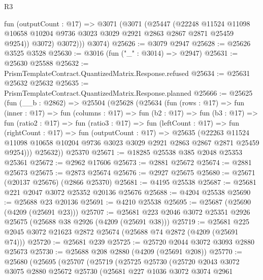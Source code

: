 \begin{lexlean}{R3}
\begin{coremodule}
          fun (outputCount : @17) =>
          @3071
            (@3071
              (@25447
                (@22248
                  @11524
                  @11098
                  @10658
                  @10204
                  @9736
                  @3023
                  @3029
                  @2921
                  @2863
                  @2867
                  @2871
                  @25459
                  @9254))
              @3072)
            @3072)))
      @3074)
@25626 := @3079 @2947
@25628 := @25626 @3525 @3528
@25630 := @3016 (fun ("_" : @3014) => @2947)
@25631 := @25630 @25588
@25632 := PrismTemplateContract.QuantizedMatrix.Response.refused
@25634 := @25631 @25632 @25632
@25635 := PrismTemplateContract.QuantizedMatrix.Response.planned
@25666 := @25625
    (fun (__b : @2862) =>
    @25504
      (@25628
        (@25634
          (fun (rows : @17) =>
          fun (inner : @17) =>
          fun (columns : @17) =>
          fun (b2 : @17) =>
          fun (b3 : @17) =>
          fun (ratio2 : @17) =>
          fun (ratio3 : @17) =>
          fun (leftCount : @17) =>
          fun (rightCount : @17) =>
          fun (outputCount : @17) =>
          @25635
            (@22263
              @11524
              @11098
              @10658
              @10204
              @9736
              @3023
              @3029
              @2921
              @2863
              @2867
              @2871
              @25459
              @9254)))
        @25632))
    @25370
@25671 := @18285 @25538 @385 @2048 @25353 @25361
@25672 := @2962 @17606
@25673 := @2881 @25672
@25674 := @2881 @25673
@25675 := @2873 @25674
@25676 := @2927 @25675
@25680 := @25671 (@20137 @25676) (@2866 @25370)
@25681 := @4195 @25538
@25687 := @25681 @221 @2047 @3072 @25352 @20136 @25676
@25688 := @4204 @25538
@25690 := @25688 @23 @20136
@25691 := @4210 @25538
@25695 := @25687 (@25690 (@4209 (@25691 @23)))
@25707 := @25681 @223 @2046 @3072 @25351 @2926 @25675 (@25688 @38 @2926 (@4209 (@25691 @38)))
@25719 := @25681 @225 @2045 @3072 @21623 @2872 @25674 (@25688 @74 @2872 (@4209 (@25691 @74)))
@25720 := @25681 @239
@25725 := @25720 @2044 @3072 @3093 @2880 @25673
@25730 := @25688 @208 @2880 (@4209 (@25691 @208))
@25770 := @25680
    (@25695
      (@25707
        (@25719
          (@25725
            @25730
            (@25720
              @2043
              @3072
              @3075
              @2880
              @25672
              @25730
              (@25681
                @227
                @1036
                @3072
                @3074
                @2961

\end{coremodule}
\end{lexlean}
